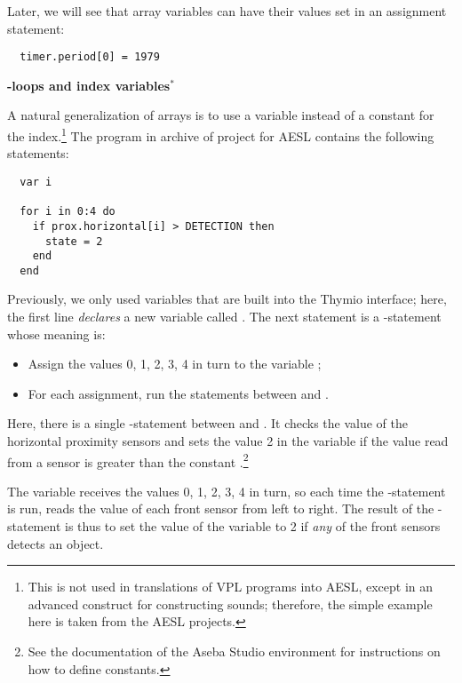 Later, we will see that array variables can have their
values set in an assignment statement:
\begin{footnotesize}
\begin{verbatim}
  timer.period[0] = 1979
\end{verbatim}
\end{footnotesize}

\textbf{\large {}-loops and index variables$^*$}

A natural generalization of arrays is to use a variable instead of a
constant for the index.\footnote{This is not used in translations of VPL
programs into AESL, except in an advanced construct for constructing
sounds; therefore, the simple example here is taken from the AESL
projects.} The program  in archive of project for AESL
contains the following statements:

\begin{footnotesize}
\begin{verbatim}
  var i

  for i in 0:4 do
    if prox.horizontal[i] > DETECTION then
      state = 2
    end
  end
\end{verbatim}
\end{footnotesize}

Previously, we only used variables that are built into the Thymio
interface; here, the first line \emph{declares} a new variable called
. The next statement is a -statement whose meaning is:

\begin{itemize}
\item Assign the values 0, 1, 2, 3, 4 in turn to the variable ;
\item For each assignment, run the statements between  and .
\end{itemize}

Here, there is a single -statement between  and . It
checks the value of the horizontal proximity sensors and sets the value
2 in the variable  if the value read from a sensor is greater
than the constant .\footnote{See the documentation of the 
Aseba Studio environment for instructions on how to define constants.}

The variable  receives the values 0, 1, 2, 3, 4 in turn, so each
time the -statement is run,  reads the value
of each front sensor from left to right. The result of the
-statement is thus to set the value of the variable  to
2 if \emph{any} of the front sensors detects an object.


